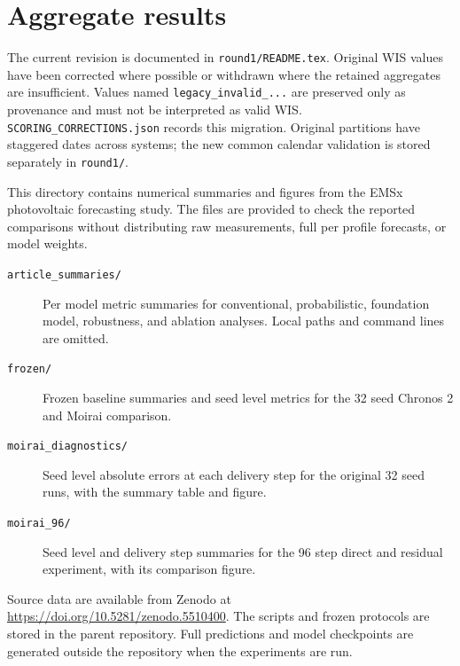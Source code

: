 \section*{Aggregate results}

The current revision is documented in \texttt{round1/README.tex}. Original WIS
values have been corrected where possible or withdrawn where the retained
aggregates are insufficient. Values named \texttt{legacy\_invalid\_...} are
preserved only as provenance and must not be interpreted as valid WIS.
\texttt{SCORING\_CORRECTIONS.json} records this migration. Original partitions
have staggered dates across systems; the new common calendar validation is
stored separately in \texttt{round1/}.

This directory contains numerical summaries and figures from the EMSx photovoltaic forecasting study. The files are provided to check the reported comparisons without distributing raw measurements, full per profile forecasts, or model weights.

\begin{description}
\item[\texttt{article\_summaries/}] Per model metric summaries for conventional, probabilistic, foundation model, robustness, and ablation analyses. Local paths and command lines are omitted.
\item[\texttt{frozen/}] Frozen baseline summaries and seed level metrics for the 32 seed Chronos 2 and Moirai comparison.
\item[\texttt{moirai\_diagnostics/}] Seed level absolute errors at each delivery step for the original 32 seed runs, with the summary table and figure.
\item[\texttt{moirai\_96/}] Seed level and delivery step summaries for the 96 step direct and residual experiment, with its comparison figure.
\end{description}

Source data are available from Zenodo at \url{https://doi.org/10.5281/zenodo.5510400}. The scripts and frozen protocols are stored in the parent repository. Full predictions and model checkpoints are generated outside the repository when the experiments are run.
